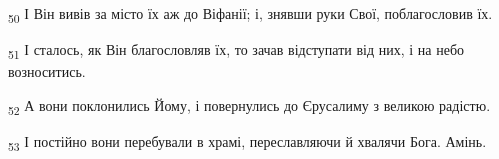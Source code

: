 \begin{tcolorbox}
\textsubscript{50} І Він вивів за місто їх аж до Віфанії; і, знявши руки Свої, поблагословив їх.
\end{tcolorbox}
\begin{tcolorbox}
\textsubscript{51} І сталось, як Він благословляв їх, то зачав відступати від них, і на небо возноситись.
\end{tcolorbox}
\begin{tcolorbox}
\textsubscript{52} А вони поклонились Йому, і повернулись до Єрусалиму з великою радістю.
\end{tcolorbox}
\begin{tcolorbox}
\textsubscript{53} І постійно вони перебували в храмі, переславляючи й хвалячи Бога. Амінь.
\end{tcolorbox}
